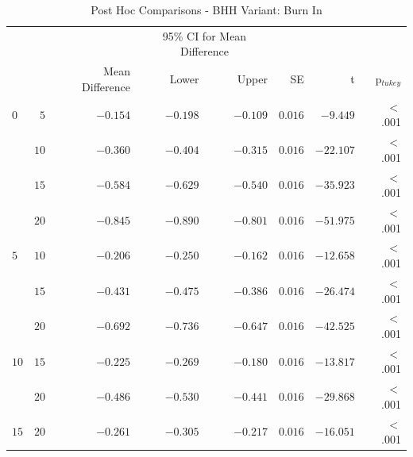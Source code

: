 \begin{table}[htbp]
	\centering
	\caption{Post Hoc Comparisons - BHH Variant: Burn In}
	\label{tab:results:burn_in:post_hoc}%
	\par\bigskip
	\resizebox{\textwidth}{!}
	{
		\begin{tabular}{lrrrrrrr}
			\toprule
			\multicolumn{1}{c}{} & \multicolumn{1}{c}{} & \multicolumn{1}{c}{} & \multicolumn{2}{c}{95\% CI for Mean Difference} & \multicolumn{1}{c}{} & \multicolumn{1}{c}{} & \multicolumn{1}{c}{} \\
			\cline{4-5}
			$ $ & $ $ & Mean Difference & Lower & Upper & SE & t & p$_{tukey}$  \\
			\cmidrule[0.4pt]{1-8}
			$0$ & $5$ & $-0.154$ & $-0.198$ & $-0.109$ & $0.016$ & $-9.449$ & $<$ .001  \\
			$ $ & $10$ & $-0.360$ & $-0.404$ & $-0.315$ & $0.016$ & $-22.107$ & $<$ .001  \\
			 & $15$ & $-0.584$ & $-0.629$ & $-0.540$ & $0.016$ & $-35.923$ & $<$ .001  \\
			 & $20$ & $-0.845$ & $-0.890$ & $-0.801$ & $0.016$ & $-51.975$ & $<$ .001  \\
			$5$ & $10$ & $-0.206$ & $-0.250$ & $-0.162$ & $0.016$ & $-12.658$ & $<$ .001  \\
			$ $ & $15$ & $-0.431$ & $-0.475$ & $-0.386$ & $0.016$ & $-26.474$ & $<$ .001  \\
			 & $20$ & $-0.692$ & $-0.736$ & $-0.647$ & $0.016$ & $-42.525$ & $<$ .001  \\
			$10$ & $15$ & $-0.225$ & $-0.269$ & $-0.180$ & $0.016$ & $-13.817$ & $<$ .001  \\
			$ $ & $20$ & $-0.486$ & $-0.530$ & $-0.441$ & $0.016$ & $-29.868$ & $<$ .001  \\
			$15$ & $20$ & $-0.261$ & $-0.305$ & $-0.217$ & $0.016$ & $-16.051$ & $<$ .001  \\
			\bottomrule
		\end{tabular}
	}
\end{table}

